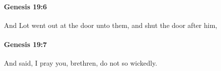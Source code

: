 		\paragraph{Genesis 19:6} %
			\label{GENESIS-19-6}

			And Lot went out at the door unto them, and shut the door after him,


		\paragraph{Genesis 19:7} %
			\label{GENESIS-19-7}

			And said, I pray you, brethren, do not so wickedly.


